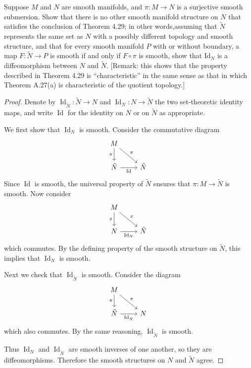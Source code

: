 \begin{problem}
    Suppose $M$ and $N$ are smooth manifolds, and $\pi \colon M \to N$ is a surjective
 smooth submersion. Show that there is no other smooth manifold structure
 on $N$ that satisfies the conclusion of Theorem 4.29; in other words,assuming
 that $\tilde{N}$ represents the same set as $N$ with a possibly different topology and
 smooth structure, and that for every smooth manifold $P$ with or without
 boundary, a map $F \colon \tilde{N} \to P$ is smooth if and only if $F \circ \pi$ is smooth, show
 that $\mathrm{Id}_N$ is a diffeomorphism between $N$ and $\tilde{N}$. [Remark: this shows that
 the property described in Theorem 4.29 is “characteristic” in the same sense
 as that in which Theorem A.27(a) is characteristic of the quotient topology.]
    \begin{proof}
    Denote by $\operatorname{Id}_{\tilde{N}} \colon \tilde{N} \to N$ and 
    $\operatorname{Id}_{N} \colon N \to \tilde{N}$ the two set-theoretic identity maps,
    and write $\operatorname{Id}$ for the identity on $N$ or on $\tilde{N}$ as appropriate.  

    We first show that $\operatorname{Id}_{N}$ is smooth.  
    Consider the commutative diagram
    \[
    \begin{tikzcd}
    M \arrow[d,"\pi"'] \arrow[dr,"\pi"] & \\
    \tilde{N} \arrow[r,"\operatorname{Id}"'] & \tilde{N}
    \end{tikzcd}
    \]
    Since $\operatorname{Id}$ is smooth, the universal property of $\tilde{N}$ ensures that 
    $\pi \colon M \to \tilde{N}$ is smooth. Now consider
    \[
    \begin{tikzcd}
    M \arrow[d,"\pi"'] \arrow[dr,"\pi"] & \\
    N \arrow[r,"\operatorname{Id}_N"'] & \tilde{N}
    \end{tikzcd}
    \]
    which commutes. By the defining property of the smooth structure on $\tilde{N}$, 
    this implies that $\operatorname{Id}_N$ is smooth.  

    Next we check that $\operatorname{Id}_{\tilde{N}}$ is smooth. Consider the diagram
    \[
    \begin{tikzcd}
    M \arrow[d,"\pi"'] \arrow[dr,"\pi"] & \\
    \tilde{N} \arrow[r,"\operatorname{Id}_{\tilde{N}}"'] & N
    \end{tikzcd}
    \]
    which also commutes. By the same reasoning, $\operatorname{Id}_{\tilde{N}}$ is smooth.  

    Thus $\operatorname{Id}_{N}$ and $\operatorname{Id}_{\tilde{N}}$ are smooth inverses of one another, 
    so they are diffeomorphisms. Therefore the smooth structures on $N$ and $\tilde{N}$ agree.
    \end{proof}
\end{problem}

